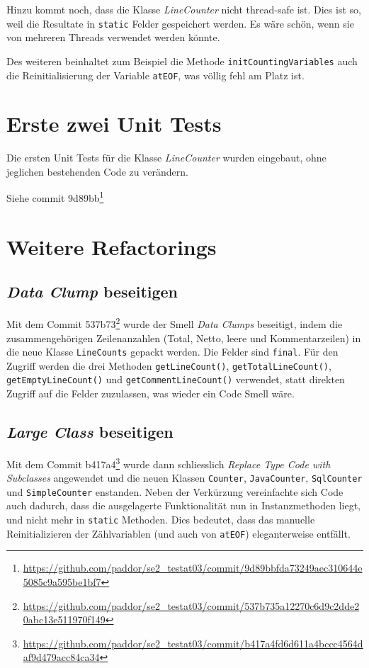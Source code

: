 \documentclass[a4paper]{article}
\newcommand{\java}[1]{\lstinline[style=customjava]{#1}} %
\begin{document}
Hinzu kommt noch, dass die Klasse \emph{LineCounter} nicht thread-safe ist.
Dies ist so, weil die Resultate in \java{static} Felder gespeichert werden. Es
w\"are sch\"on, wenn sie von mehreren Threads verwendet werden k\"onnte.

Des weiteren beinhaltet zum Beispiel die Methode \java{initCountingVariables}
auch die Reinitialisierung der Variable \java{atEOF}, was v\"ollig fehl am
Platz ist.

\section{Erste zwei Unit Tests}
Die ersten Unit Tests f\"ur die Klasse \emph{LineCounter} wurden eingebaut, ohne jeglichen bestehenden Code zu ver\"andern.

Siehe commit 9d89bb\footnote{\url{https://github.com/paddor/se2_testat03/commit/9d89bbfda73249aec310644e5085c9a595be1bf7}}

\section{Weitere Refactorings}

\subsection{\emph{Data Clump} beseitigen}
Mit dem Commit
537b73\footnote{\url{https://github.com/paddor/se2_testat03/commit/537b735a12270c6d9c2dde20abc13e511970f149}}
wurde der Smell \emph{Data Clumps} beseitigt, indem die zusammengeh\"origen
Zeilenanzahlen (Total, Netto, leere und Kommentarzeilen) in die neue Klasse
\java{LineCounts} gepackt werden. Die Felder sind \java{final}. F\"ur den
Zugriff werden die drei Methoden \java{getLineCount()},
\java{getTotalLineCount()}, \java{getEmptyLineCount()} und
\java{getCommentLineCount()} verwendet, statt direkten Zugriff auf die Felder
zuzulassen, was wieder ein Code Smell w\"are.

\subsection{\emph{Large Class} beseitigen}
Mit dem Commit
b417a4\footnote{\url{https://github.com/paddor/se2_testat03/commit/b417a4fd6d611a4bccc4564daf9d479acc84ca34}}
wurde dann schliesslich \emph{Replace Type Code with Subclasses} angewendet und
die neuen Klassen \java{Counter}, \java{JavaCounter}, \java{SqlCounter} und
\java{SimpleCounter} enstanden. Neben der Verk\"urzung vereinfachte sich Code
auch dadurch, dass die ausgelagerte Funktionalit\"at nun in Instanzmethoden
liegt, und nicht mehr in \java{static} Methoden. Dies bedeutet, dass das
manuelle Reinitializieren der Z\"ahlvariablen (und auch von \java{atEOF})
eleganterweise entf\"allt.
\end{document}
